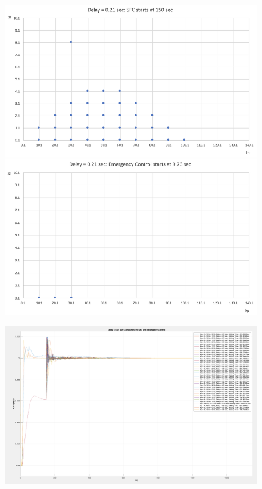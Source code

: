 \begin{figure}[htbp]
\centering
\includegraphics[width = .819\textwidth]{figure/6_4_copare_21.png}
\caption{}
\label{6_4_copare_21}
\end{figure}


\begin{figure}[htbp]
\centering
\includegraphics[width = .819\textwidth]{figure/6_4_CompaPlots_21.png}
\caption{}
\label{6_4_CompaPlots_21}
\end{figure}
